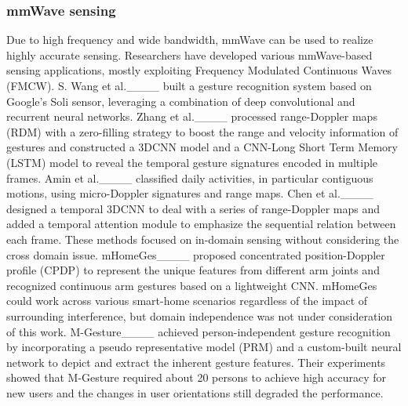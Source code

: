 \subsubsection{mmWave sensing}
Due to high frequency and wide bandwidth, mmWave can be used to realize highly accurate sensing. Researchers have developed various mmWave-based sensing applications, mostly exploiting Frequency Modulated Continuous Waves (FMCW). 
S. Wang et al.____ built a gesture recognition system based on Google’s Soli sensor, leveraging a combination of deep convolutional and recurrent neural networks.
Zhang et al.____ processed range-Doppler maps (RDM) with a zero-filling strategy to boost the range and velocity information of gestures and constructed a 3DCNN model and a CNN-Long Short Term Memory (LSTM) model to reveal the temporal gesture signatures encoded in multiple frames. 
Amin et al.____ classified daily activities, in particular contiguous motions, using micro-Doppler signatures and range maps. 
Chen et al.____ designed a temporal 3DCNN to deal with a series of range-Doppler maps and added a temporal attention module to emphasize the sequential relation between each frame. 
These methods focused on in-domain sensing without considering the cross domain issue.
mHomeGes____ proposed concentrated position-Doppler profile (CPDP) to represent the unique features from different arm joints and recognized continuous arm gestures based on a lightweight CNN. mHomeGes could work across various smart-home scenarios regardless of the impact of surrounding interference, but domain independence was not under consideration of this work.  
M-Gesture____ achieved person-independent gesture recognition by incorporating a pseudo representative model (PRM) and a custom-built neural network to depict and extract the inherent gesture features. Their experiments showed that M-Gesture required about 20 persons to achieve high accuracy for new users and the changes in user orientations still degraded the performance. 
 
